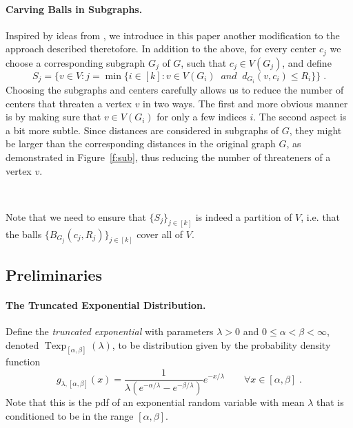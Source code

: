 \documentclass[11pt,fleqn]{article}
\DeclareMathOperator{\texp}{Texp}
\begin{document}
\paragraph{Carving Balls in Subgraphs.} Inspired by ideas from \cite{AGGNT14}, we introduce in this paper another modification to the approach described theretofore. In addition to the above, for every center $c_j$ we choose a corresponding subgraph $G_j$ of $G$, such that $c_j \in V(G_j)$, and define 
$$S_j = \{v \in V : j = \min\{i \in [k] : v \in V(G_i) \;\; and \;\; d_{G_i}(v,c_i) \le R_i \}\} \;.$$
Choosing the subgraphs and centers carefully allows us to reduce the number of centers that threaten a vertex $v$ in two ways. The first and more obvious manner is by making sure that $v \in V(G_i)$ for only a few indices $i$. The second aspect is a bit more subtle. Since distances are considered in subgraphs of $G$, they might be larger than the corresponding distances in the original graph $G$, as demonstrated in Figure~\ref{f:sub}, thus reducing the number of threateners of a vertex $v$.

\begin{figure*}[t]
  \begin{center}
     \hspace{3pc}
    \ 
  \end{center}
  \caption{When carving balls in a subgraph of $G$, the number of threateners to a vertex is smaller.}
  \label{f:sub}
\end{figure*}


Note that we need to ensure that $\{S_j\}_{j \in [k]}$ is indeed a partition of $V$, i.e. that the balls $\{B_{G_j}(c_j,R_j)\}_{j \in [k]}$ cover all of $V$.

\subsection{Preliminaries}
\paragraph{The Truncated Exponential Distribution.} Define the {\em truncated exponential} with parameters $\lambda >0$ and $0 \le \alpha < \beta < \infty$, 
denoted $\texp_{[\alpha,\beta]}(\lambda)$,
to be distribution given by the probability density function 
$$g_{\lambda,[\alpha,\beta]}(x) = \frac{1}{\lambda(e^{- \alpha / \lambda} - e^{- \beta / \lambda})}e^{- x/ \lambda}  \quad \quad \forall x \in [\alpha,\beta] \;.$$
Note that this is the pdf of an exponential random variable with mean $\lambda$ that is conditioned to be in the range $[\alpha,\beta]$.
\end{document}

